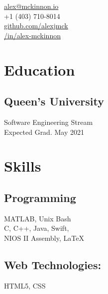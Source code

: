 \documentclass[]{hieudo-build}
\begin{document}
%
%
{
	\faEnvelope \href{mailto:alex@mckinnon.io}{ alex@mckinnon.io}\\
	\faPhone \thinspace +1 (403) 710-8014\\
	\faGithub \href{https://github.com/alexjmck}{   github.com/alexjmck}\\
	\faLinkedinSquare \href{https://www.linkedin.com/in/alex-mckinnon}{   /in/alex-mckinnon}
}
    
%
%
\begin{minipage}[t]{0.34\textwidth} 

\section{Education} 

\subsection{Queen's University}
Software Engineering Stream \\
Expected Grad. May 2021 \\
\sectionsep

\section{Skills}
\subsection{Programming}
MATLAB, Unix Bash\\ 
C, C++, Java, Swift,\\
NIOS II Assembly, \LaTeX

\subsection{Web Technologies:}
HTML5, CSS \\


\end{minipage}
\end{document}
